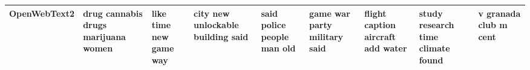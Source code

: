 \documentclass[11pt,a4paper]{article}
\begin{document}
\begin{appendices}
\begin{table*}[htb]
\begin{tiny}
\begin{tabular}{|p{}|p{}|p{}|p{}|p{}|p{}|p{}|p{}|p{}|}
    OpenWebText2 & drug \newline cannabis \newline drugs \newline marijuana \newline women & like \newline time \newline new \newline game \newline way & city \newline new \newline unlockable \newline building \newline said & said \newline police \newline people \newline man \newline old & game \newline war \newline party \newline military \newline said & flight \newline caption \newline aircraft \newline add \newline water & study \newline research \newline time \newline climate \newline found & v \newline granada \newline club \newline m \newline cent\\\hline

\end{tabular}
\end{tiny}
\end{table*}
\end{appendices}
\end{document}

